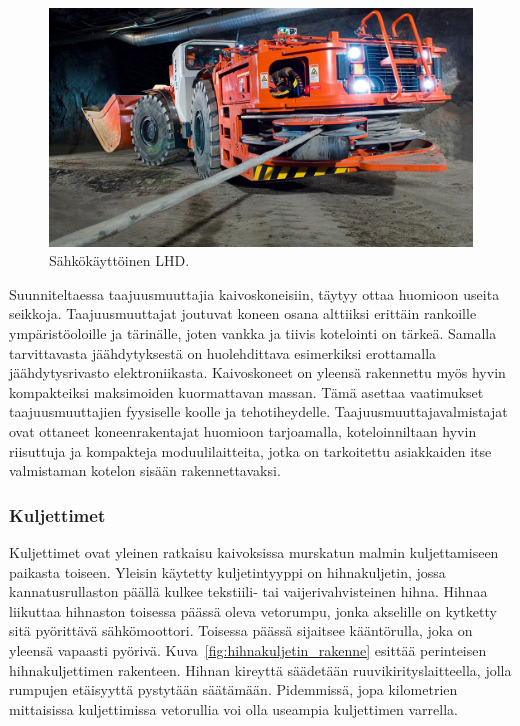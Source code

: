 \documentclass[finnish,12pt,a4paper,pdftex,elec,utf8]{aaltothesis}
\begin{document}
\\\\
\begin{figure}[H]
	\begin{center}
	\includegraphics[scale=0.35]{LHD}
	\end{center}
	\caption{Sähkökäyttöinen LHD.
		\cite{LHD}}
	\label{fig:LHD}
\end{figure}
\noindent
Suunniteltaessa taajuusmuuttajia kaivoskoneisiin, täytyy ottaa huomioon useita seikkoja. Taajuusmuuttajat joutuvat koneen osana alttiiksi erittäin rankoille ympäristöoloille ja tärinälle, joten vankka ja tiivis kotelointi on tärkeä. Samalla tarvittavasta jäähdytyksestä on huolehdittava esimerkiksi erottamalla jäähdytysrivasto elektroniikasta. Kaivoskoneet on yleensä rakennettu myös hyvin kompakteiksi maksimoiden kuormattavan massan. Tämä asettaa vaatimukset taajuusmuuttajien fyysiselle koolle ja tehotiheydelle. Taajuusmuuttajavalmistajat ovat ottaneet koneenrakentajat huomioon tarjoamalla, koteloinniltaan hyvin riisuttuja ja kompakteja moduulilaitteita, jotka on tarkoitettu asiakkaiden itse valmistaman kotelon sisään rakennettavaksi.

\subsubsection{Kuljettimet}
Kuljettimet ovat yleinen ratkaisu kaivoksissa murskatun malmin kuljettamiseen paikasta toiseen. Yleisin käytetty kuljetintyyppi on hihnakuljetin, jossa kannatusrullaston päällä kulkee tekstiili- tai vaijerivahvisteinen hihna. Hihnaa liikuttaa hihnaston toisessa päässä oleva vetorumpu, jonka akselille on kytketty sitä pyörittävä sähkömoottori. Toisessa päässä sijaitsee kääntörulla, joka on yleensä vapaasti pyörivä. Kuva~\ref{fig:hihnakuljetin_rakenne} esittää perinteisen hihnakuljettimen rakenteen. Hihnan kireyttä säädetään ruuvikirityslaitteella, jolla rumpujen etäisyyttä pystytään säätämään. Pidemmissä, jopa kilometrien mittaisissa kuljettimissa vetorullia voi olla useampia kuljettimen varrella. \cite{Hakapää}
\end{document}
